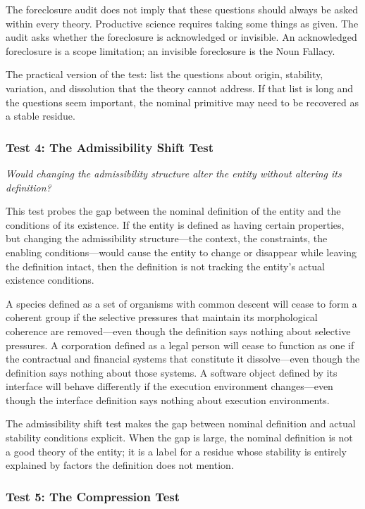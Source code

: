 \documentclass[12pt, a4paper]{article}
\theoremstyle{plain}
\theoremstyle{definition}
\theoremstyle{remark}
\begin{document}
The foreclosure audit does not imply that these questions should always be
asked within every theory. Productive science requires taking some things as
given. The audit asks whether the foreclosure is acknowledged or invisible.
An acknowledged foreclosure is a scope limitation; an invisible foreclosure
is the Noun Fallacy.

The practical version of the test: list the questions about origin, stability,
variation, and dissolution that the theory cannot address. If that list is
long and the questions seem important, the nominal primitive may need to be
recovered as a stable residue.

\subsubsection*{Test 4: The Admissibility Shift Test}

\textit{Would changing the admissibility structure alter the entity without
altering its definition?}

This test probes the gap between the nominal definition of the entity and the
conditions of its existence. If the entity is defined as having certain
properties, but changing the admissibility structure---the context, the
constraints, the enabling conditions---would cause the entity to change or
disappear while leaving the definition intact, then the definition is not
tracking the entity's actual existence conditions.

A species defined as a set of organisms with common descent will cease to
form a coherent group if the selective pressures that maintain its
morphological coherence are removed---even though the definition says nothing
about selective pressures. A corporation defined as a legal person will cease
to function as one if the contractual and financial systems that constitute
it dissolve---even though the definition says nothing about those systems.
A software object defined by its interface will behave differently if the
execution environment changes---even though the interface definition says
nothing about execution environments.

The admissibility shift test makes the gap between nominal definition and
actual stability conditions explicit. When the gap is large, the nominal
definition is not a good theory of the entity; it is a label for a residue
whose stability is entirely explained by factors the definition does not mention.

\subsubsection*{Test 5: The Compression Test}
\end{document}
